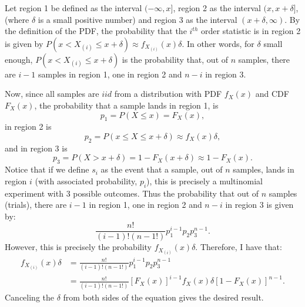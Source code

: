 \begin{problem}{10}  Let region 1 be defined as the interval $(-\infty, x]$, region 2 as the interval $(x, x+\delta]$, (where $\delta$ is a small positive number) and region 3 as the interval $(x+\delta, \infty)$.  By the definition of the PDF, the probability that the $i^{th}$ order statistic is in region 2 is given by $P(x<X_{(i)} \le x+ \delta) \approx f_{X_{(i)}}(x) \delta$.  In other words, for $\delta$ small enough, $P(x<X_{(i)} \le x+ \delta)$ is the probability that, out of $n$ samples, there are $i-1$ samples in region 1, one in region 2 and $n-i$ in region 3.  

Now, since all samples are $iid$ from a distribution with PDF $f_X(x)$ and CDF $F_X(x)$, the probability that a sample lands in region 1, is
\begin{equation*}
p_1 = P(X\le x) = F_X(x),
\end{equation*}
in region 2 is
\begin{equation*}
p_2 = P(x \le X \le x+\delta) \approx f_X(x) \delta,
\end{equation*}
and in region 3 is
\begin{equation*}
p_3 = P(X>x+\delta) = 1-F_X(x+\delta) \approx 1-F_X(x).
\end{equation*}
Notice that if we define $s_i$ as the event that a sample, out of $n$ samples, lands in region $i$ (with associated probability, $p_i$), this is precisely a multinomial experiment with 3 possible outcomes.  Thus the probability that out of $n$ samples (trials), there are $i-1$ in region 1, one in region 2 and $n-i$ in region 3 is given by:
\begin{equation*}
\frac{n!}{(i-1)!(n-1!)}p_1^{i-1} p_2 p_3^{n-1}.
\end{equation*}
However, this is precisely the probability $f_{X_{(i)}}(x) \delta$.  Therefore, I have that:
\begin{align*}
f_{X_{(i)}}(x) \delta &=\frac{n!}{(i-1)!(n-1!)}p_1^{i-1} p_2 p_3^{n-1}\\
&= \frac{n!}{(i-1)!(n-1!)}[F_X(x)]^{i-1} f_X(x) \delta [1-F_X(x)]^{n-1}.
\end{align*}
Canceling the $\delta$ from both sides of the equation gives the desired result.


\end{problem}

